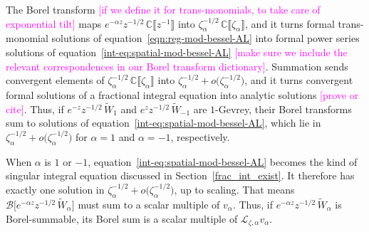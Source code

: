 \documentclass{article}
\theoremstyle{definition}
\newcommand{\C}{\mathbb{C}}
\newcommand{\laplace}{\mathcal{L}}
\newcommand{\borel}{\mathcal{B}}
\begin{document}
The Borel transform \textcolor{magenta}{[if we define it for trans-monomials, to take care of exponential tilt]} maps $e^{-\alpha z} z^{-1/2}\,\C\llbracket z^{-1} \rrbracket$ into $\zeta_\alpha^{-1/2}\,\C\llbracket \zeta_\alpha \rrbracket$, and it turns formal trans-monomial solutions of equation~\eqref{eqn:reg-mod-bessel-AL} into formal power series solutions of equation~\eqref{int-eq:spatial-mod-bessel-AL} \textcolor{magenta}{[make sure we include the relevant correspondences in our Borel transform dictionary]}. Summation sends convergent elements of $\zeta_\alpha^{-1/2}\,\C\llbracket \zeta_\alpha \rrbracket$ into $\zeta_\alpha^{-1/2}+ o\big(\zeta_\alpha^{-1/2}\big)$, and it turns convergent formal solutions of a fractional integral equation into analytic solutions \textcolor{magenta}{[prove or cite]}. Thus, if $e^{-z} z^{-1/2}\,\tilde{W}_1$ and $e^z z^{-1/2}\,\tilde{W}_{-1}$ are $1$-Gevrey, their Borel transforms sum to solutions of equation~\eqref{int-eq:spatial-mod-bessel-AL}, which lie in $\zeta_\alpha^{-1/2} + o\big(\zeta_\alpha^{-1/2}\big)$ for $\alpha = 1$ and $\alpha = -1$, respectively.

When $\alpha$ is $1$ or $-1$, equation~\eqref{int-eq:spatial-mod-bessel-AL} becomes the kind of singular integral equation discussed in Section~\ref{frac_int_exist}. It therefore has exactly one solution in $\zeta_\alpha^{-1/2} + o\big(\zeta_\alpha^{-1/2}\big)$, up to scaling. That means $\borel\big[ e^{-\alpha z} z^{-1/2}\,\tilde{W}_\alpha \big]$ must sum to a scalar multiple of $v_\alpha$. Thus, if $e^{-\alpha z} z^{-1/2}\,\tilde{W}_\alpha$ is Borel-summable, its Borel sum is a scalar multiple of $\laplace_{\zeta, \alpha} v_\alpha$.
\end{document}
